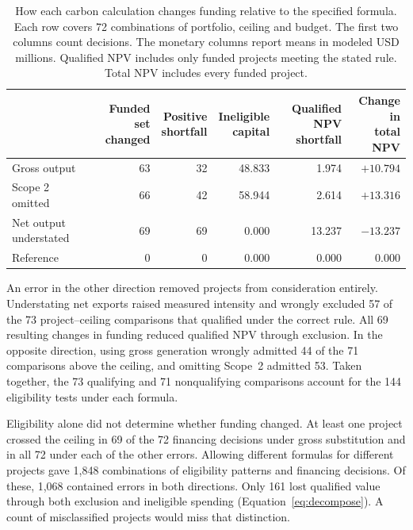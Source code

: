 \documentclass[ijfs,article,submit,oneauthor]{Definitions/mdpi}
\begin{document}
\begin{table}[!htb]\centering
\caption{How each carbon calculation changes funding relative to the specified formula. Each row covers 72 combinations of portfolio, ceiling and budget. The first two columns count decisions. The monetary columns report means in modeled USD millions. Qualified NPV includes only funded projects meeting the stated rule. Total NPV includes every funded project.}\label{tab:money}
\small\setlength{\tabcolsep}{4pt}
\begin{tabularx}{\linewidth}{@{}Xrrrrr@{}}\toprule
 & \shortstack[r]{Funded set\\changed} & \shortstack[r]{Positive\\shortfall} & \shortstack[r]{Ineligible\\capital} & \shortstack[r]{Qualified NPV\\shortfall} & \shortstack[r]{Change in\\total NPV}\\\midrule
Gross output & 63 & 32 & 48.833 & 1.974 & $+10.794$\\
Scope 2 omitted & 66 & 42 & 58.944 & 2.614 & $+13.316$\\
Net output understated & 69 & 69 & 0.000 & 13.237 & $-13.237$\\
Reference & 0 & 0 & 0.000 & 0.000 & 0.000\\\bottomrule
\end{tabularx}
\end{table}

An error in the other direction removed projects from consideration entirely. Understating net exports raised measured intensity and wrongly excluded 57 of the 73 project--ceiling comparisons that qualified under the correct rule. All 69 resulting changes in funding reduced qualified NPV through exclusion. In the opposite direction, using gross generation wrongly admitted 44 of the 71 comparisons above the ceiling, and omitting Scope~2 admitted 53. Taken together, the 73 qualifying and 71 nonqualifying comparisons account for the 144 eligibility tests under each formula.

\begin{samepage}
Eligibility alone did not determine whether funding changed. At least one project crossed the ceiling in 69 of the 72 financing decisions under gross substitution and in all 72 under each of the other errors. Allowing different formulas for different projects gave 1,848 combinations of eligibility patterns and financing decisions. Of these, 1,068 contained errors in both directions. Only 161 lost qualified value through both exclusion and ineligible spending (Equation~\eqref{eq:decompose}). A count of misclassified projects would miss that distinction.
\par\end{samepage}
\end{document}
